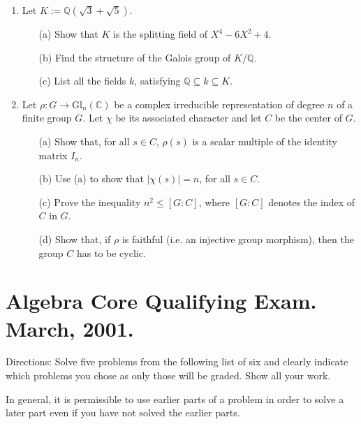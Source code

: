 \documentclass{article}
\begin{document}
\begin{enumerate}
    \item Let \(K:=\mathbb{Q}(\sqrt{3}+\sqrt{5})\).
    \begin{itemize}
        \item[(a)] Show that \(K\) is the splitting field of \(X^4-6X^2+4\).
        \item[(b)] Find the structure of the Galois group of \(K/\mathbb{Q}\).
        \item[(c)] List all the fields \(k\), satisfying \(\mathbb{Q} \subseteq k \subseteq K\).
    \end{itemize}

    \item Let \(\rho:G \to \text{Gl}_n(\mathbb{C})\) be a complex irreducible representation of degree \(n\) of a finite group \(G\). Let \(\chi\) be its associated character and let \(C\) be the center of \(G\).
    \begin{itemize}
        \item[(a)] Show that, for all \(s \in C\), \(\rho(s)\) is a scalar multiple of the identity matrix \(I_n\).
        \item[(b)] Use (a) to show that \(|\chi(s)|=n\), for all \(s \in C\).
        \item[(c)] Prove the inequality \(n^2 \leq [G:C]\), where \([G:C]\) denotes the index of \(C\) in \(G\).
        \item[(d)] Show that, if \(\rho\) is faithful (i.e. an injective group morphism), then the group \(C\) has to be cyclic.
    \end{itemize}
\end{enumerate}

\section*{Algebra Core Qualifying Exam. March, 2001.}

Directions: Solve five problems from the following list of six and clearly indicate which problems you chose as only those will be graded. Show all your work.

In general, it is permissible to use earlier parts of a problem in order to solve a later part even if you have not solved the earlier parts.
\end{document}
